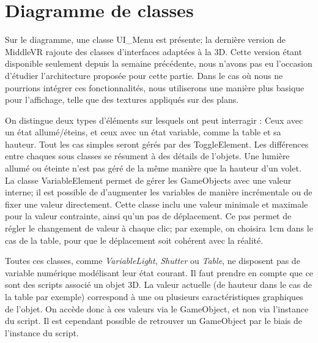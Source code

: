 \section{Diagramme de classes}

Sur le diagramme, une classe UI_Menu est présente; la dernière version de MiddleVR rajoute des classes d'interfaces adaptées à la 3D.
Cette version étant disponible seulement depuis la semaine précédente, nous n'avons pas eu l'occasion d'étudier l'architecture proposée pour cette partie.
Dans le cas où nous ne pourrions intégrer ces fonctionnalités, nous utiliserons une manière plus basique pour l'affichage, telle que des textures appliqués sur des plans.
 
On distingue deux types d'éléments sur lesquels ont peut interragir : Ceux avec un état allumé/éteins, et ceux avec un état variable, comme la table et sa hauteur.
Tout les cas simples seront gérés par des ToggleElement. Les différences entre chaques sous classes se résument à des détails de l'objets.
Une lumière allumé ou éteinte n'est pas géré de la même manière que la hauteur d'un volet.
La classe VariableElement permet de gérer les GameObjects avec une valeur interne; il est possible de d'augmenter les variables de manière incrémentale ou de fixer une valeur directement.
Cette classe inclu une valeur minimale et maximale pour la valeur contrainte, ainsi qu'un pas de déplacement.
Ce pas permet de régler le changement de valeur à chaque clic; par exemple, on choisira 1cm dans le cas de la table, pour que le déplacement soit cohérent avec la réalité.

Toutes ces classes, comme \textit{VariableLight}, \textit{Shutter} ou \textit{Table},  ne disposent pas de variable numérique modélisant leur état courant. 
Il faut prendre en compte que ce sont des scripts associé un objet 3D. 
La valeur actuelle (de hauteur dans le cas de la table par exemple) correspond à une ou plusieurs caractéristiques graphiques de l'objet.
On accède donc à ces valeurs via le GameObject, et non via l'instance du script. 
Il est cependant possible de retrouver un GameObject par le biais de l'instance du script.
